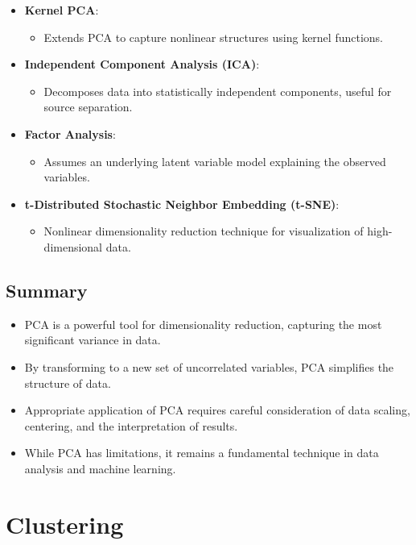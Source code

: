 \documentclass{article}
\begin{document}
\begin{itemize}
    \item \textbf{Kernel PCA}:
    \begin{itemize}
        \item Extends PCA to capture nonlinear structures using kernel functions.
    \end{itemize}
    \item \textbf{Independent Component Analysis (ICA)}:
    \begin{itemize}
        \item Decomposes data into statistically independent components, useful for source separation.
    \end{itemize}
    \item \textbf{Factor Analysis}:
    \begin{itemize}
        \item Assumes an underlying latent variable model explaining the observed variables.
    \end{itemize}
    \item \textbf{t-Distributed Stochastic Neighbor Embedding (t-SNE)}:
    \begin{itemize}
        \item Nonlinear dimensionality reduction technique for visualization of high-dimensional data.
    \end{itemize}
\end{itemize}

\subsection{Summary}

\begin{itemize}
    \item PCA is a powerful tool for dimensionality reduction, capturing the most significant variance in data.
    \item By transforming to a new set of uncorrelated variables, PCA simplifies the structure of data.
    \item Appropriate application of PCA requires careful consideration of data scaling, centering, and the interpretation of results.
    \item While PCA has limitations, it remains a fundamental technique in data analysis and machine learning.
\end{itemize}

\section{Clustering}
\end{document}
